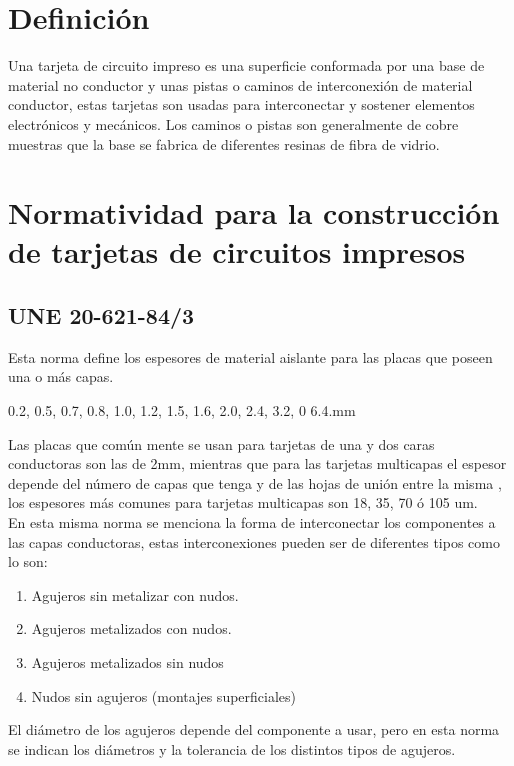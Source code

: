 \documentclass[a4paper,12pt,twoside]{proyectotanquesecci}
\begin{document}
\section{Definición}

Una tarjeta de circuito impreso es una superficie conformada por una base de material no conductor y unas pistas o caminos de interconexión de material conductor, estas tarjetas son usadas para interconectar y sostener elementos electrónicos y mecánicos.
Los caminos o pistas son generalmente  de cobre  muestras que la base se fabrica de diferentes resinas de fibra de vidrio.

\section{Normatividad para la construcción de  tarjetas de circuitos impresos}

\subsection{UNE  20-621-84/3}

Esta norma define  los espesores de material aislante para las placas que poseen una o más capas.

\begin{center}
0.2, 0.5, 0.7, 0.8, 1.0, 1.2, 1.5, 1.6, 2.0, 2.4, 3.2, 0 6.4.mm
\end{center}

Las placas que común mente se usan para  tarjetas de una y dos caras conductoras son las  de 2mm, mientras que para las tarjetas multicapas  el espesor depende del número de capas que tenga  y de las hojas de unión entre la misma , los espesores más comunes para tarjetas multicapas son 18, 35, 70 ó 105 um.\\

En esta misma norma  se menciona la forma de interconectar los componentes  a las capas conductoras, estas interconexiones pueden ser de diferentes tipos como lo son:

\begin{enumerate}
\item Agujeros sin metalizar con nudos.
\item Agujeros metalizados con nudos.
\item Agujeros metalizados sin nudos 
\item Nudos sin agujeros (montajes superficiales)
\end{enumerate}

El diámetro de los agujeros depende del componente a usar,  pero en esta norma  se indican los diámetros y la tolerancia de los distintos tipos de agujeros.
\end{document}
